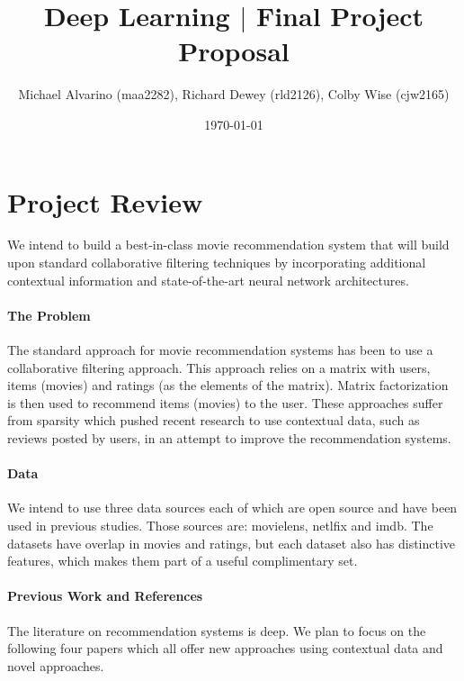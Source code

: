 \documentclass{article}
\begin{document}
\title{Deep Learning $|$ Final Project Proposal}
\author{Michael Alvarino (maa2282), Richard Dewey (rld2126), Colby Wise (cjw2165)}
\date{\today}

\maketitle

\section{Project Review} We intend to build a best-in-class movie recommendation system that will build upon standard collaborative filtering techniques by incorporating additional contextual information and state-of-the-art neural network architectures. 

\paragraph{The Problem} The standard approach for movie recommendation systems has been to use a collaborative filtering approach. This approach relies on a matrix with users, items (movies) and ratings (as the elements of the matrix).  Matrix factorization is then used to recommend items (movies) to the user. These approaches suffer from sparsity which pushed recent research to use contextual data, such as reviews posted by users, in an attempt to improve the recommendation systems.

\paragraph{Data} We intend to use three data sources each of which are open source and have been used in previous studies. Those sources are: movielens, netlfix and imdb. The datasets have overlap in movies and ratings, but each dataset also has distinctive features, which makes them part of a useful complimentary set. 

\paragraph{Previous Work and References} The literature on recommendation systems is deep. We plan to focus on the following four papers which all offer new approaches using contextual data and novel approaches. 
\end{document}

